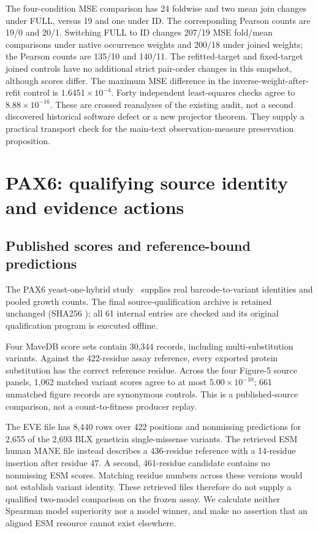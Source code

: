 

The four-condition MSE comparison has 24 foldwise and two mean join changes under FULL, versus 19 and one under ID. The corresponding Pearson counts are 19/0 and 20/1. Switching FULL to ID changes 207/19 MSE fold/mean comparisons under native occurrence weights and 200/18 under joined weights; the Pearson counts are 135/10 and 140/11. The refitted-target and fixed-target joined controls have no additional strict pair-order changes in this snapshot, although scores differ. The maximum MSE difference in the inverse-weight-after-refit control is $1.6451\times10^{-4}$. Forty independent least-squares checks agree to $8.88\times10^{-16}$. These are crossed reanalyses of the existing audit, not a second discovered historical software defect or a new projector theorem. They supply a practical transport check for the main-text observation-measure preservation proposition.

\FloatBarrier
\section{PAX6: qualifying source identity and evidence actions}\label{sec:suppax6}
\FloatBarrier
\subsection{Published scores and reference-bound predictions}
The PAX6 yeast-one-hybrid study~\cite{mcdonnell2024pax6} supplies real barcode-to-variant identities and pooled growth counts. The final source-qualification archive is retained unchanged (SHA256 \texttt{}); all 61 internal entries are checked and its original qualification program is executed offline.

Four MaveDB score sets contain 30,344 records, including multi-substitution variants. Against the 422-residue assay reference, every exported protein substitution has the correct reference residue. Across the four Figure-5 source panels, 1,062 matched variant scores agree to at most $5.00\times10^{-10}$; 661 unmatched figure records are synonymous controls. This is a published-source comparison, not a count-to-fitness producer replay.



The EVE file has 8,440 rows over 422 positions and nonmissing predictions for 2,655 of the 2,693 BLX geneticin single-missense variants. The retrieved ESM human MANE file instead describes a 436-residue reference with a 14-residue insertion after residue 47. A second, 461-residue candidate contains no nonmissing ESM scores. Matching residue numbers across these versions would not establish variant identity. These retrieved files therefore do not supply a qualified two-model comparison on the frozen assay. We calculate neither Spearman model superiority nor a model winner, and make no assertion that an aligned ESM resource cannot exist elsewhere.

